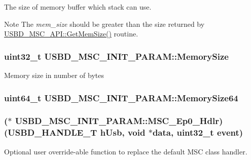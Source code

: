 The size of memory buffer which stack can use. \begin{DoxyNote}{Note}
The {\itshape mem\-\_\-size} should be greater than the size returned by \hyperlink{structUSBD__MSC__API_a73a9d240b20fcd83e6d2c9675420d626}{U\-S\-B\-D\-\_\-\-M\-S\-C\-\_\-\-A\-P\-I\-::\-Get\-Mem\-Size()} routine. 
\end{DoxyNote}
\hypertarget{structUSBD__MSC__INIT__PARAM_af5cecd156943a33ccaa619ea8a9d596d}{
\subsubsection[{Memory\-Size}]{\setlength{\rightskip}{0pt plus 5cm}uint32\-\_\-t U\-S\-B\-D\-\_\-\-M\-S\-C\-\_\-\-I\-N\-I\-T\-\_\-\-P\-A\-R\-A\-M\-::\-Memory\-Size}}\label{structUSBD__MSC__INIT__PARAM_af5cecd156943a33ccaa619ea8a9d596d}
Memory size in number of bytes \hypertarget{structUSBD__MSC__INIT__PARAM_abca96b7a6d9b77020bdca1ffdd153e56}{
\subsubsection[{Memory\-Size64}]{\setlength{\rightskip}{0pt plus 5cm}uint64\-\_\-t U\-S\-B\-D\-\_\-\-M\-S\-C\-\_\-\-I\-N\-I\-T\-\_\-\-P\-A\-R\-A\-M\-::\-Memory\-Size64}}\label{structUSBD__MSC__INIT__PARAM_abca96b7a6d9b77020bdca1ffdd153e56}
\hypertarget{structUSBD__MSC__INIT__PARAM_a8d26976b5d4d4e2249b5daac19617bee}{
\subsubsection[{M\-S\-C\-\_\-\-Ep0\-\_\-\-Hdlr}]{($\ast$ U\-S\-B\-D\-\_\-\-M\-S\-C\-\_\-\-I\-N\-I\-T\-\_\-\-P\-A\-R\-A\-M\-::\-M\-S\-C\-\_\-\-Ep0\-\_\-\-Hdlr)({\bf U\-S\-B\-D\-\_\-\-H\-A\-N\-D\-L\-E\-\_\-\-T} h\-Usb, {\bf void} $\ast$data, uint32\-\_\-t event)}}\label{structUSBD__MSC__INIT__PARAM_a8d26976b5d4d4e2249b5daac19617bee}
Optional user override-\/able function to replace the default M\-S\-C class handler.

